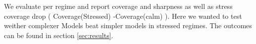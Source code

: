 We evaluate per regime and report coverage and sharpness as well as stress coverage drop ( Coverage(Stressed) -Coverage(calm) ). Here we wanted to test weither complexer Models beat simpler models in stressed regimes. The outcomes can be found in section \ref{sec:results}.
%
%







